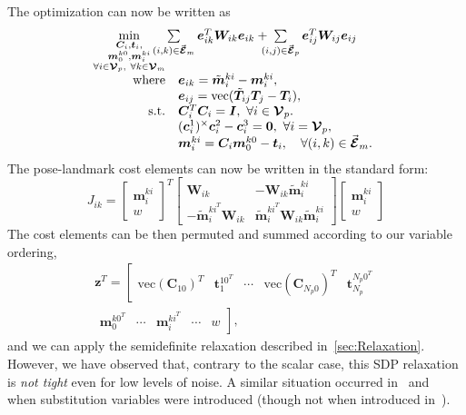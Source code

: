 \documentclass[lettersize,journal]{IEEEtran}
\newcommand{\EdgeSet}{\vec{\bm{\mathcal{E}}}}
\newcommand{\VertSetP}{\bm{\mathcal{V}}_p}
\newcommand{\VertSetM}{\bm{\mathcal{V}}_m}
\newcommand{\vect}[1]{\mbox{vec}(#1)}
\begin{document}
The optimization can now be written as
\begin{equation}
	\hspace*{-5pt}
	\label{opt:SLAM}
	\begin{array}{rl} 
		\min \limits_{ \substack{\bm{C}_i,\bm{t}_i, \\ \bm{m}_0^{k0},\bm{m}_i^{ki} \\ \forall i\in \VertSetP,~ \forall k\in\VertSetM } } & \hspace*{-20pt}\sum\limits_{(i,k)\in\EdgeSet_m} \bm{e}_{ik}^T \bm{W}_{ik} \bm{e}_{ik} + \hspace*{-7pt}\sum\limits_{(i,j)\in\EdgeSet_p}  \bm{e}_{ij}^T \bm{W}_{ij} \bm{e}_{ij}\hfill \\
		\mbox{where} & \bm{e}_{ik} = \tilde{\bm{m}}_i^{ki} - \bm{m}_i^{ki},\\
		&\bm{e}_{ij} = \vect{\tilde{\bm{T}}_{ij}\bm{T}_j - \bm{T}_i},\\
		\mbox{s.t.}&\bm{C}_i^T \bm{C}_i = \bm{I},~\forall i \in \VertSetP.\\
		& (\bm{c}_i^{1})^\times\bm{c}_i^{2} - \bm{c}_i^{3} = \bm{0},~\forall i = \VertSetP,\\
		& \bm{m}_i^{ki} = \bm{C}_i\bm{m}_0^{k0} - \bm{t}_i, \quad \forall (i,k)\in\EdgeSet_m.
	\end{array}
\end{equation}
The pose-landmark cost elements can now be written in the standard form:
\begin{equation*}
	J_{ik}=\begin{bmatrix}
		\bm{m}_i^{ki}\\w
	\end{bmatrix}^T \begin{bmatrix}
		\bm{W}_{ik} & -\bm{W}_{ik}\tilde{\bm{m}}_i^{ki}\\
		-\tilde{\bm{m}}_i^{ki^T}\bm{W}_{ik} & \tilde{\bm{m}}_i^{ki^T}\bm{W}_{ik}\tilde{\bm{m}}_i^{ki}
	\end{bmatrix}\begin{bmatrix}
	\bm{m}_i^{ki}\\w
	\end{bmatrix}
\end{equation*}
The cost elements can be then permuted and summed according to our variable ordering,
\begin{multline}
	\bm{z}^T = \left[\begin{matrix}\vect{\bm{C}_{10}}^T &\bm{t}_1^{10^T} & \cdots &\vect{\bm{C}_{N_p0}}^T&\bm{t}_{N_p}^{N_p0^T} \end{matrix}\right. \\
		\left.\begin{matrix} \bm{m}_0^{k0^T} &\cdots& \bm{m}_i^{ki^T} & \cdots & w \end{matrix}\right],
\end{multline}
and we can apply the semidefinite relaxation described in~\ref{sec:Relaxation}. However, we have observed that, contrary to the scalar case, this SDP relaxation is \emph{not tight} even for low levels of noise. A similar situation occurred in~\cite{brialesCertifiablyGloballyOptimal2018} and~\cite{yangTEASERFastCertifiable2021} when substitution variables were introduced (though not when introduced in~\cite{dumbgenSafeSmoothCertified2023}).
\end{document}
